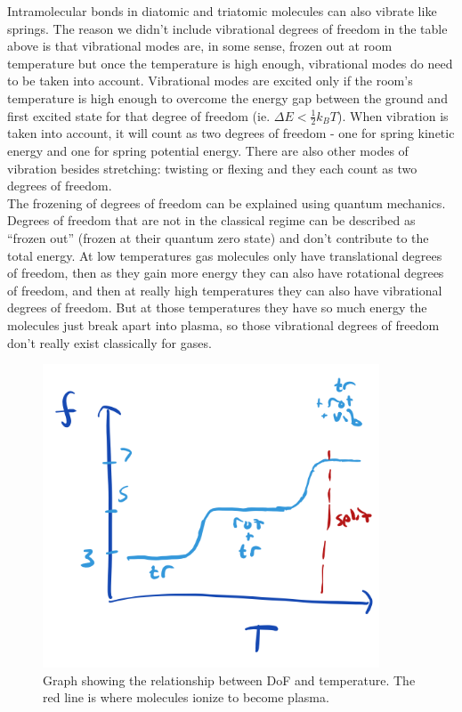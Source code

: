 Intramolecular bonds in diatomic and triatomic molecules can also vibrate like springs. The reason we didn't include vibrational degrees of freedom in the table above is that vibrational modes are, in some sense, frozen out at room temperature but once the temperature is high enough, vibrational modes do need to be taken into account. Vibrational modes are excited only if the room's temperature is high enough to overcome the energy gap between the ground and first excited state for that degree of freedom (ie. $\Delta E < \frac12k_BT$). When vibration is taken into account, it will count as two degrees of freedom - one for spring kinetic energy and one for spring potential energy. There are also other modes of vibration besides stretching: twisting or flexing and they each count as two degrees of freedom. \\

The frozening of degrees of freedom can be explained using quantum mechanics. Degrees of freedom that are not in the classical regime can be described as ``frozen out'' (frozen at their quantum zero state) and don’t contribute to the total energy. At low temperatures gas molecules only have translational degrees of freedom, then as they gain more energy they can also have rotational degrees of freedom, and then at really high temperatures they can also have vibrational degrees of freedom. But at those temperatures they have so much energy the molecules just break apart into plasma, so those vibrational degrees of freedom don't really exist classically for gases.

\begin{figure}[H]
	\centering
	\includegraphics[width=100mm]{22.png}
	\caption{Graph showing the relationship between DoF and temperature. The red line is where molecules ionize to become plasma.}
\end{figure}

